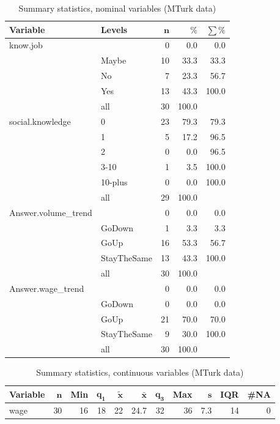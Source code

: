 \documentclass[a4paper,10pt]{article}\usepackage[]{graphicx}\usepackage[]{color}
\begin{document}
\begin{table}[ht]
\centering
{\footnotesize
\begin{tabular}{ll|rrr}
 \textbf{Variable} & \textbf{Levels} & $\mathbf{n}$ & $\mathbf{\%}$ & $\mathbf{\sum \%}$ \\ 
  \hline
know.job &  & 0 & 0.0 & 0.0 \\ 
   & Maybe & 10 & 33.3 & 33.3 \\ 
   & No & 7 & 23.3 & 56.7 \\ 
   & Yes & 13 & 43.3 & 100.0 \\ 
   \hline
 & all & 30 & 100.0 &  \\ 
   \hline
\hline
social.knowledge & 0 & 23 & 79.3 & 79.3 \\ 
   & 1 & 5 & 17.2 & 96.5 \\ 
   & 2 & 0 & 0.0 & 96.5 \\ 
   & 3-10 & 1 & 3.5 & 100.0 \\ 
   & 10-plus & 0 & 0.0 & 100.0 \\ 
   \hline
 & all & 29 & 100.0 &  \\ 
   \hline
\hline
Answer.volume\_trend &  & 0 & 0.0 & 0.0 \\ 
   & GoDown & 1 & 3.3 & 3.3 \\ 
   & GoUp & 16 & 53.3 & 56.7 \\ 
   & StayTheSame & 13 & 43.3 & 100.0 \\ 
   \hline
 & all & 30 & 100.0 &  \\ 
   \hline
\hline
Answer.wage\_trend &  & 0 & 0.0 & 0.0 \\ 
   & GoDown & 0 & 0.0 & 0.0 \\ 
   & GoUp & 21 & 70.0 & 70.0 \\ 
   & StayTheSame & 9 & 30.0 & 100.0 \\ 
   \hline
 & all & 30 & 100.0 &  \\ 
   \hline
\hline
\end{tabular}
}
\caption{Summary statistics, nominal variables (MTurk data)} 
\label{tab1:13-1160}
\end{table}
\begin{table}[ht]
\centering
{\footnotesize
\begin{tabular}{lrrrrrrrrrr}
 \textbf{Variable} & $\mathbf{n}$ & \textbf{Min} & $\mathbf{q_1}$ & $\mathbf{\widetilde{x}}$ & $\mathbf{\bar{x}}$ & $\mathbf{q_3}$ & \textbf{Max} & $\mathbf{s}$ & \textbf{IQR} & \textbf{\#NA} \\ 
  \hline
wage & 30 & 16 & 18 & 22 & 24.7 & 32 & 36 & 7.3 & 14 & 0 \\ 
  \end{tabular}
}
\caption{Summary statistics, continuous variables (MTurk data)} 
\label{tab2:13-1160}
\end{table}
\end{document}
